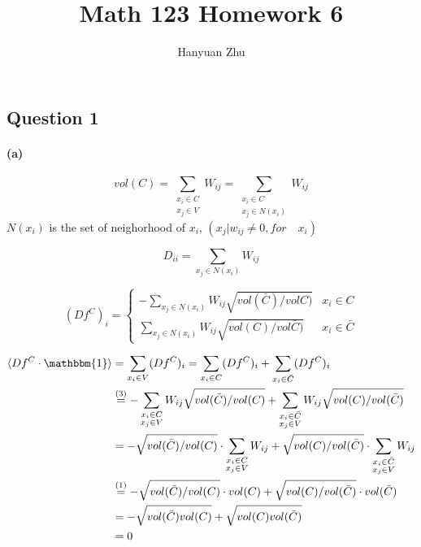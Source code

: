 \documentclass{article}
\title{Math 123 Homework 6}
\author{Hanyuan Zhu}
\begin{document}
\maketitle

\subsection*{Question 1}

\paragraph{(a)}

\begin{equation}
  vol(C) = \sum_{\substack{x_{i} \in C \\ x_{j} \in V}} W_{ij} = \sum_{\substack{x_{i} \in C \\ x_{j} \in N(x_{i})}} W_{ij}
\end{equation}
$N(x_{i})$ is the set of neighorhood of $x_i$, $(x_{j}|w_{ij} \neq 0, for \quad x_{i})$


\begin{equation}
  D_{ii} = \sum_{x_j \in N(x_{i})} W_{ij}
\end{equation}

\begin{equation}
  (Df^{C})_{i} = \begin{cases} -\sum_{x_j \in N(x_{i})} W_{ij} \sqrt{vol(\bar{C})/vol{C})} & x_{i} \in C\\
                                \sum_{x_j \in N(x_{i})} W_{ij} \sqrt{vol(C)/vol{\bar{C}})} & x_{i} \in \bar{C}
                  \end{cases}
\end{equation}


\begin{equation}
  \begin{split}
  \langle Df^{C} \cdot  \mathbbm{1} \rangle & =  \sum_{x_i \in V} (Df^{C})_{i} = \sum_{x_i \in C} (Df^{C})_{i} +\sum_{x_i \in \bar{C}} (Df^{C})_{i} \\
  & \overset{(3)}{=} -\sum_{\substack{x_{i} \in C \\ x_{j} \in V}} W_{ij} \sqrt{vol(\bar{C})/vol(C)} + \sum_{\substack{x_{i} \in \bar{C} \\ x_{j} \in V}} W_{ij} \sqrt{vol(C)/vol(\bar{C})}\\
  & = - \sqrt{vol(\bar{C})/vol(C)} \cdot \sum_{\substack{x_{i} \in C \\ x_{j} \in V}} W_{ij}  + \sqrt{vol(C)/vol(\bar{C})} \cdot \sum_{\substack{x_{i} \in \bar{C} \\ x_{j} \in V}} W_{ij} \\
  & \overset{(1)}{=} - \sqrt{vol(\bar{C})/vol(C)} \cdot vol(C) + \sqrt{vol(C)/vol(\bar{C})} \cdot vol(\bar{C})\\
  & = - \sqrt{vol(\bar{C})vol(C)} +\sqrt{vol(C) vol(\bar{C})} \\
  & = 0
  \end{split}
\end{equation}
\end{document}

